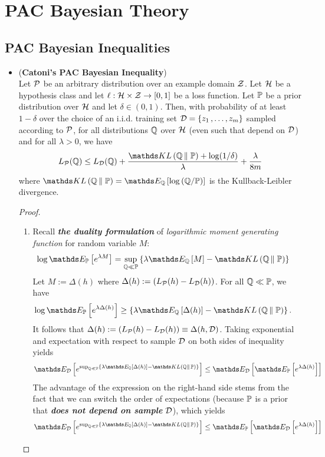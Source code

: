 \documentclass[11pt]{article}
\begin{document}
\section{PAC Bayesian Theory}
\subsection{PAC Bayesian Inequalities}
\begin{itemize}
\item \begin{theorem} (\textbf{Catoni's PAC Bayesian Inequality})\citep{catoni2003pac, alquier2021user}\\
Let ${\mathcal P}$ be an arbitrary distribution over an example domain ${\mathcal Z}$. Let ${\mathcal H}$ be a hypothesis class and let $\ell: {\mathcal H} \times {\mathcal Z} \to [0,1]$ be a loss function. Let ${\mathbb P}$ be a prior distribution over ${\mathcal H}$ and let $\delta \in (0,1)$. Then, with probability of at least $1 - \delta$ over
the choice of an i.i.d. training set ${\mathcal D} = \left\{z_1 \,{,}\ldots{,}\, z_m\right\}$ sampled according to ${\mathcal P}$, for all distributions ${\mathbb Q}$ over ${\mathcal H}$ (even such that depend on ${\mathcal D}$) and for all $\lambda >0$, we have
\begin{align}
L_{\cP}(\bQ) \le L_{\cD}(\bQ) + \frac{\kl{\bQ}{\bP}  + \log(1/\delta) }{\lambda} +  \frac{\lambda }{8m}  \label{ineqn: catoni_pac_bayes_kl}
\end{align} where $\kl{\bQ}{\bP} = \E{\bQ}{\log \paren{\bQ / \bP}}$ is the Kullback-Leibler divergence.
\end{theorem}
\begin{proof}
\begin{enumerate}
\item Recall \textit{\textbf{the duality formulation}} of \emph{logarithmic moment generating function} for random variable $M$:
\begin{align*}
\log \E{\bP}{e^{\lambda M}} &= \sup_{\bQ \ll \bP}\set{ \lambda \E{\bQ}{M} - \kl{\bQ}{\bP} }
\end{align*} Let $M := \Delta(h)$ where $\Delta(h) := \left(L_{{\mathcal P}}(h) - L_{{\mathcal D}}(h)\right)$. For all ${\mathbb Q} \ll {\mathbb P}$, we have
\begin{align}
\log \E{\bP}{e^{\lambda \Delta(h)}} &\ge \set{ \lambda \E{\bQ}{\Delta(h)} - \kl{\bQ}{\bP} }. \label{pf: catoni_pac_bayes_kl_1}
\end{align} It follows that $\Delta(h) := \left(L_{{\mathcal P}}(h) - L_{{\mathcal D}}(h)\right) \equiv \Delta(h, {\mathcal D})$. Taking exponential and expectation with respect to sample ${\mathcal D}$ on both sides of inequality yields
\begin{align}
\E{\cD}{e^{\sup_{\bQ \ll \bP}\set{\lambda\E{\bQ}{\Delta(h)} - \kl{\bQ}{\bP} }}} &\le \E{\cD}{\E{\bP}{e^{\lambda \Delta(h)}}} \label{pf: catoni_pac_bayes_kl_2}
\end{align}
The advantage of the expression on the right-hand side stems from the fact that we can switch the order of expectations (because ${\mathbb P}$ is a prior that \emph{\textbf{does not depend on sample}} ${\mathcal D}$), which yields
\begin{align}
\E{\cD}{e^{\sup_{\bQ \ll \bP}\set{\lambda\E{\bQ}{\Delta(h)} - \kl{\bQ}{\bP} }}} &\le \E{\bP}{\E{\cD}{e^{\lambda \Delta(h)}}} \label{pf: catoni_pac_bayes_kl_3}
\end{align}


\end{enumerate}
\end{proof}
\end{itemize}
\end{document}
